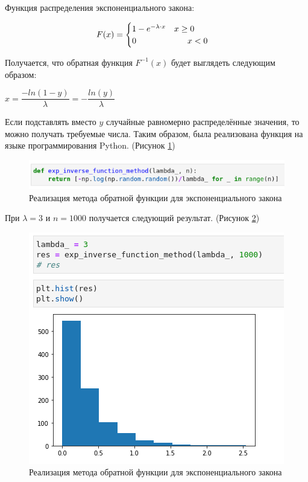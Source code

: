 \documentclass[14pt,fleqn]{extarticle}
\begin{document}
	Функция распределения экспоненциального закона:
	\begin{ceqn}
	\begin{align*}
		F(x) =
		\begin{cases}
			1 - e^{-\lambda \cdot x} \quad x \geq 0\\
			0 \hspace{2.15cm} x < 0
		\end{cases}
	\end{align*}
	\end{ceqn}

	Получается, что обратная функция $F^{-1}(x)$ будет выглядеть следующим образом:
	\begin{center}
		$x = \dfrac{-ln(1-y)}{\lambda} = -\dfrac{ln(y)}{\lambda}$
	\end{center}
	Если подставлять вместо $y$ случайные равномерно распределённые значения, то можно получать требуемые числа.
	\newpage
	Таким образом, была реализована функция на языке программирования Python. (Рисунок \ref{fig:exp_inverse_function_method_code})
	\begin{figure}[h]
		\centering \includegraphics[scale=0.8]{code3}
		\caption{Реализация метода обратной функции для экспоненциального закона}
		\label{fig:exp_inverse_function_method_code}
	\end{figure}

	При $\lambda = 3$ и $n = 1000$ получается следующий результат. (Рисунок \ref{fig:exp_inverse_function_method_result})
	\begin{figure}[h]
		\centering \includegraphics[scale=0.8]{result3}
		\caption{Реализация метода обратной функции для экспоненциального закона}
		\label{fig:exp_inverse_function_method_result}
	\end{figure}
\end{document}
